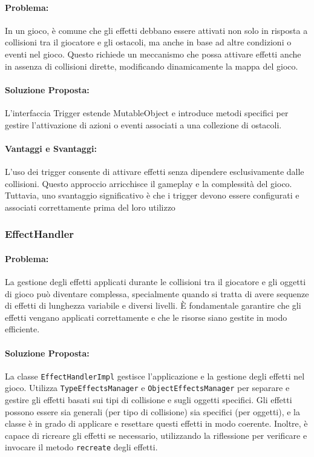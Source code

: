 \documentclass[a4paper,12pt]{report}
\begin{document}
\paragraph{Problema:} In un gioco, è comune che gli effetti debbano essere attivati non solo in risposta a collisioni tra il giocatore e gli ostacoli, ma anche in base ad altre condizioni o eventi nel gioco. Questo richiede un meccanismo che possa attivare effetti anche in assenza di collisioni dirette, modificando dinamicamente la mappa del gioco.
\paragraph{Soluzione Proposta:} L’interfaccia Trigger estende MutableObject e introduce metodi specifici per gestire l’attivazione di azioni o eventi associati a una collezione di ostacoli. 
\paragraph{Vantaggi e Svantaggi:}
L’uso dei trigger consente di attivare effetti senza dipendere esclusivamente dalle collisioni. Questo approccio arricchisce il gameplay e la complessità del gioco. Tuttavia, uno svantaggio significativo è che i trigger devono essere configurati e associati correttamente prima del loro utilizzo


\subsubsection{EffectHandler}
\paragraph{Problema:} La gestione degli effetti applicati durante le collisioni tra il giocatore e gli oggetti di gioco può diventare complessa, specialmente quando si tratta di avere sequenze di effetti di lunghezza variabile e diversi livelli. È fondamentale garantire che gli effetti vengano applicati correttamente e che le risorse siano gestite in modo efficiente.
\paragraph{Soluzione Proposta:} La classe \texttt{EffectHandlerImpl} gestisce l’applicazione e la gestione degli effetti nel gioco. Utilizza \texttt{TypeEffectsManager} e \texttt{ObjectEffectsManager} per separare e gestire gli effetti basati sui tipi di collisione e sugli oggetti specifici. Gli effetti possono essere sia generali (per tipo di collisione) sia specifici (per oggetti), e la classe è in grado di applicare e resettare questi effetti in modo coerente. Inoltre, è capace di ricreare gli effetti se necessario, utilizzando la riflessione per verificare e invocare il metodo \texttt{recreate} degli effetti.
\end{document}
